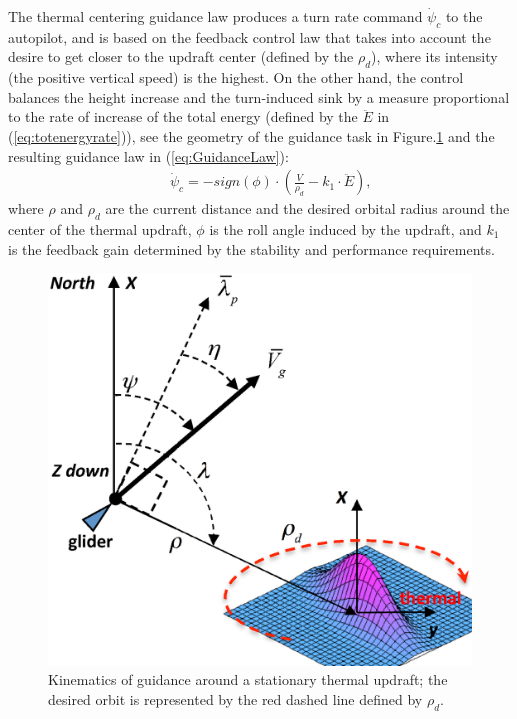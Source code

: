 \documentclass{ifacconf}
\begin{document}
The thermal centering guidance law produces a turn rate command $\dot{\psi}_{c}$ to the
autopilot, and is based on the feedback control law that takes into account the desire to
get closer to the updraft center (defined by the $\rho_d$), where its intensity (the
positive vertical speed) is the highest. On the other hand, the control balances the
height increase and the turn-induced sink by a measure proportional to the rate of
increase of the total energy (defined by the $\ddot{E}$ in (\ref{eq:totenergyrate})), see
the geometry of the guidance task in Figure.\ref{fig:ThermaG} and the resulting guidance
law in (\ref{eq:GuidanceLaw}):
\begin{eqnarray}
    && \dot{\psi}_{c}=-sign(\phi) \cdot (\frac{V}{\rho_d}-k_1 \cdot \ddot{E}),
    \label{eq:GuidanceLaw}
\end{eqnarray}
where $\rho$ and $\rho_d$ are the current distance and the desired orbital
radius around the center of the thermal updraft, $\phi$ is the roll angle
induced by the updraft, and $k_1$ is the feedback gain determined by the
stability and performance requirements.
\begin{figure}[thpb]
  \centering
  \includegraphics[scale=0.3]{Figures/ThermalG.eps}
  \caption{Kinematics of guidance around a stationary thermal updraft;
  the desired orbit is represented by the red dashed line defined by $\rho_d$.}
  \label{fig:ThermaG}
\end{figure}
\end{document}
